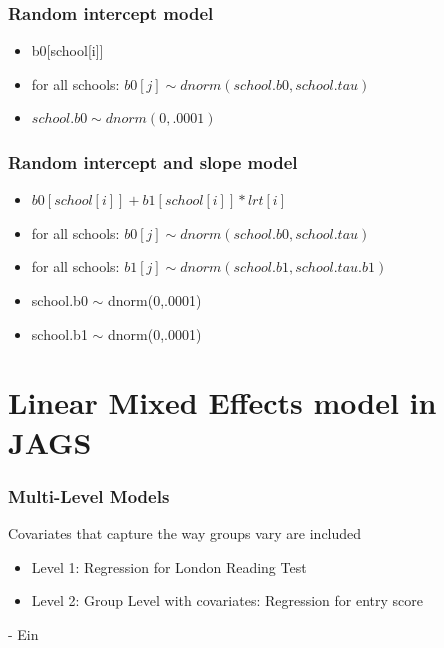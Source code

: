 \documentclass[hyperref={pdfpagelabels=false},unknownkeysallowed]{beamer}
\begin{document}
\begin{frame}
\frametitle{Random intercept model}
\begin{itemize}
\item b0[school[i]]
\item for all schools: $b0[j] \sim dnorm(school.b0,school.tau) $
\item $school.b0 \sim dnorm(0,.0001)$
\end{itemize}
\note{}
\end{frame}

\begin{frame}
\frametitle{Random intercept and slope model}
\begin{itemize}
\item $b0[school[i]]+b1[school[i]]*lrt[i]$
\item for all schools: $b0[j] \sim dnorm(school.b0,school.tau) $
\item for all schools: $b1[j] \sim dnorm(school.b1,school.tau.b1)$
\item school.b0 $\sim$ dnorm(0,.0001)
\item school.b1 $\sim$ dnorm(0,.0001)
\end{itemize}
\note{}
\end{frame}

\section{Linear Mixed Effects model in JAGS}

\begin{frame}
\frametitle{Multi-Level Models}
Covariates that capture the way groups vary are included

\begin{itemize}
\item Level 1: Regression for London Reading Test
\item Level 2: Group Level with covariates: Regression for entry score
\end{itemize} - Ein
\note{}
\end{frame}

%

\end{document}
